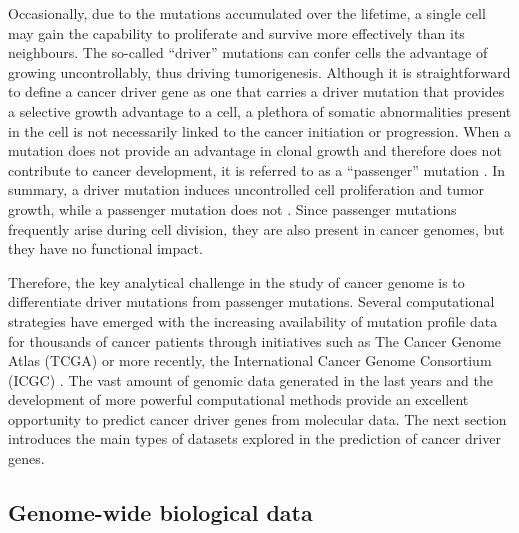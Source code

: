 Occasionally, due to the mutations accumulated over the lifetime, a single cell may gain the capability to proliferate and survive more effectively than its neighbours. The so-called ``driver'' mutations can confer cells the advantage of growing uncontrollably, thus driving tumorigenesis.  Although it is straightforward to define a cancer driver gene as one that carries a driver mutation that provides a selective growth advantage to a cell, a plethora of somatic abnormalities present in the cell is not necessarily linked to the cancer initiation or progression. When a mutation does not provide an advantage in clonal growth and therefore does not contribute to cancer development, it is referred to as a ``passenger'' mutation \cite{vogelstein2013cancer}. In summary, a driver mutation induces uncontrolled cell proliferation and tumor growth, while a passenger mutation does not \cite{stratton2009cancer}. Since passenger mutations frequently arise during cell division, they are also present in cancer genomes, but they have no functional impact.


Therefore, the key analytical challenge in the study of cancer genome is to differentiate driver mutations from passenger mutations. Several computational strategies have emerged with the increasing availability of mutation profile data for thousands of cancer patients through initiatives such as The Cancer Genome Atlas (TCGA) or more recently, the International Cancer Genome Consortium (ICGC) \cite{hirano2020pan}. The vast amount of genomic data generated in the last years and the development of more powerful computational methods provide an excellent opportunity to predict cancer driver genes from molecular data. The next section introduces the main types of datasets explored in the prediction of cancer driver genes.



\subsection{Genome-wide biological data}
\label{sec:background:bio_data}

